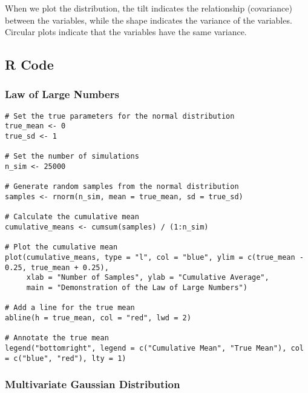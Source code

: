 \documentclass{article}
\begin{document}
When we plot the distribution, the tilt indicates the relationship (covariance) between the variables, while the shape indicates the variance of the variables. Circular plots indicate that the variables have the same variance.

\pagebreak

\subsection{R Code}

\subsubsection*{Law of Large Numbers}

\begin{lstlisting}
# Set the true parameters for the normal distribution
true_mean <- 0
true_sd <- 1

# Set the number of simulations
n_sim <- 25000

# Generate random samples from the normal distribution
samples <- rnorm(n_sim, mean = true_mean, sd = true_sd)

# Calculate the cumulative mean
cumulative_means <- cumsum(samples) / (1:n_sim)

# Plot the cumulative mean
plot(cumulative_means, type = "l", col = "blue", ylim = c(true_mean - 0.25, true_mean + 0.25),
     xlab = "Number of Samples", ylab = "Cumulative Average",
     main = "Demonstration of the Law of Large Numbers")

# Add a line for the true mean
abline(h = true_mean, col = "red", lwd = 2)

# Annotate the true mean
legend("bottomright", legend = c("Cumulative Mean", "True Mean"), col = c("blue", "red"), lty = 1)
\end{lstlisting}

\subsubsection*{Multivariate Gaussian Distribution}
\end{document}
